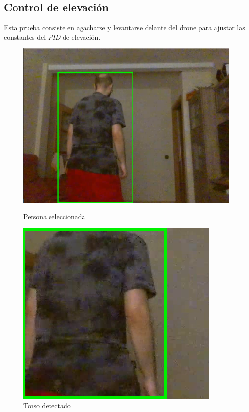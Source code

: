 \subsection*{Control de elevación}
Esta prueba consiste en agacharse y levantarse delante del drone para ajustar las constantes del \textit{PID} de elevación.

\begin{figure}[!htb]
    \includegraphics[width=\linewidth]{figures/real/cap1.png}
    \caption{Persona seleccionada}\label{fig:real1}
\endminipage\hfill
{}
    \includegraphics[width=\linewidth]{figures/real/cap2.png}
    \caption{Torso detectado}\label{fig:real2}
\endminipage\hfill
\end{figure}
